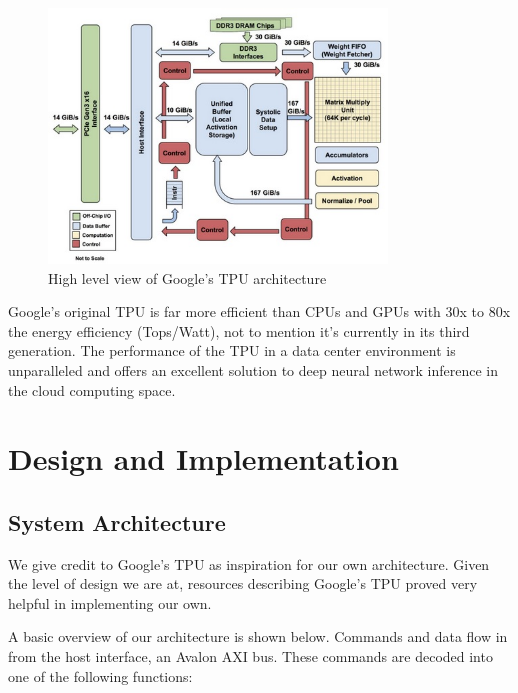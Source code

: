 \documentclass[11pt, conference, onecolumn]{IEEEtran}
\begin{document}
    \newpage

    \begin{figure}[htbp]
        \centering
        \includegraphics[width=9cm]{../figures/googleArchitecture.jpg}
        \caption{High level view of Google's TPU architecture \cite{b1}}
    \end{figure}

    Google’s original TPU is far more efficient than CPUs and GPUs with 30x to
    80x the energy efficiency (Tops/Watt), not to mention it’s currently in its third
    generation. The performance of the TPU in a data center environment is unparalleled
    and offers an excellent solution to deep neural network inference in the cloud computing
    space.


\section{Design and Implementation}

    \subsection{System Architecture}
        We give credit to Google's TPU as inspiration for our own architecture. Given the
        level of design we are at, resources describing Google's TPU proved very helpful
        in implementing our own.

        A basic overview of our architecture is shown below. Commands and data flow in
        from the host interface, an Avalon AXI bus. These commands are decoded into one of
        the following functions:
\end{document}
